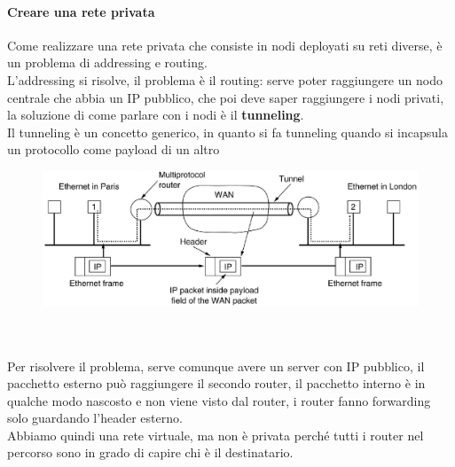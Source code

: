 \documentclass[12pt, oneside]{extbook} %
\begin{document}
\paragraph{Creare una rete privata} Come realizzare una rete privata che consiste in nodi deployati su reti diverse, è un problema di addressing e routing.
\\L'addressing si risolve, il problema è il routing: serve poter raggiungere un nodo centrale che abbia un IP pubblico, che poi deve saper raggiungere i nodi privati, la soluzione di come parlare con i nodi è il \textbf{tunneling}.
\\Il tunneling è un concetto generico, in quanto si fa tunneling quando si incapsula un protocollo come payload di un altro\\ 
\begin{figure}[h!]
    \centering
    \includegraphics[scale=0.5]{../../immagini/vpn_tunnel}
\end{figure}\\\\
Per risolvere il problema, serve comunque avere un server con IP pubblico, il pacchetto esterno può raggiungere il secondo router, il pacchetto interno è in qualche modo nascosto e non viene visto dal router, i router fanno forwarding solo guardando l'header esterno.
\\Abbiamo quindi una rete virtuale, ma non è privata perché tutti i router nel percorso sono in grado di capire chi è il destinatario.\\
\end{document}
